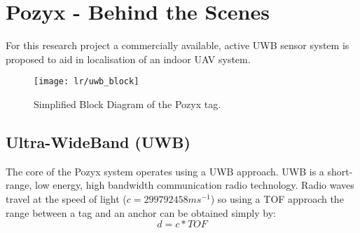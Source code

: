 \section{Pozyx - Behind the Scenes}\label{sec:pozyx---behind-the-scenes}
For this research project a commercially available, active UWB sensor system is proposed to aid in localisation of an indoor UAV system.
\begin{figure}[h!]
    \centering
    \texttt{[image: lr/uwb\_block]}
    \caption{Simplified Block Diagram of the Pozyx tag.}
\end{figure}
\subsection{Ultra-WideBand (UWB)}
The core of the Pozyx system operates using a UWB approach.
UWB is a short-range, low energy, high bandwidth communication radio technology.
Radio waves travel at the speed of light ($c=299792458ms^{-1}$) so using a TOF approach the range between a tag and an anchor can be obtained simply by:
\[
    d = c*TOF
\]

